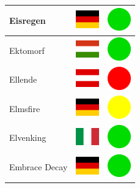 \documentclass[12pt, a4paper, twoside]{report}
\begin{document}
\begin{center}
\begin{longtable}{|p{5cm}|p{2cm}|p{2cm}|}
Eisregen & \includegraphics[width=1cm]{4x3/de} & \includegraphics[width=1cm]{likes/y} \\ \hline
Ektomorf & \includegraphics[width=1cm]{4x3/hu} & \includegraphics[width=1cm]{likes/y} \\ \hline
Ellende & \includegraphics[width=1cm]{4x3/at} & \includegraphics[width=1cm]{likes/n} \\ \hline
Elmsfire & \includegraphics[width=1cm]{4x3/de} & \includegraphics[width=1cm]{likes/m} \\ \hline
Elvenking & \includegraphics[width=1cm]{4x3/it} & \includegraphics[width=1cm]{likes/y} \\ \hline
Embrace Decay & \includegraphics[width=1cm]{4x3/de} & \includegraphics[width=1cm]{likes/y} \\ \hline

\end{longtable}
\end{center}
\end{document}
